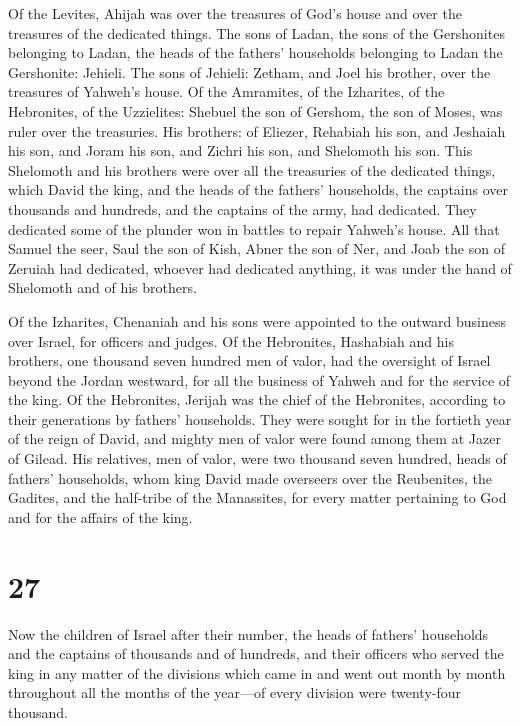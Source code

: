  Of the Levites, Ahijah was over the treasures of God's
house and over the treasures of the dedicated things.  The
sons of Ladan, the sons of the Gershonites belonging to Ladan, the heads
of the fathers' households belonging to Ladan the Gershonite: Jehieli.
 The sons of Jehieli: Zetham, and Joel his brother, over
the treasures of Yahweh's house.  Of the Amramites, of the
Izharites, of the Hebronites, of the Uzzielites:  Shebuel
the son of Gershom, the son of Moses, was ruler over the treasuries.
 His brothers: of Eliezer, Rehabiah his son, and Jeshaiah
his son, and Joram his son, and Zichri his son, and Shelomoth his son.
 This Shelomoth and his brothers were over all the
treasuries of the dedicated things, which David the king, and the heads
of the fathers' households, the captains over thousands and hundreds,
and the captains of the army, had dedicated.  They
dedicated some of the plunder won in battles to repair Yahweh's house.
 All that Samuel the seer, Saul the son of Kish, Abner the
son of Ner, and Joab the son of Zeruiah had dedicated, whoever had
dedicated anything, it was under the hand of Shelomoth and of his
brothers.

 Of the Izharites, Chenaniah and his sons were appointed to
the outward business over Israel, for officers and judges. 
Of the Hebronites, Hashabiah and his brothers, one thousand seven
hundred men of valor, had the oversight of Israel beyond the Jordan
westward, for all the business of Yahweh and for the service of the
king.  Of the Hebronites, Jerijah was the chief of the
Hebronites, according to their generations by fathers' households. They
were sought for in the fortieth year of the reign of David, and mighty
men of valor were found among them at Jazer of Gilead.  His
relatives, men of valor, were two thousand seven hundred, heads of
fathers' households, whom king David made overseers over the Reubenites,
the Gadites, and the half-tribe of the Manassites, for every matter
pertaining to God and for the affairs of the king.

\hypertarget{section-26}{%
\section{27}\label{section-26}}

 Now the children of Israel after their number, the heads of
fathers' households and the captains of thousands and of hundreds, and
their officers who served the king in any matter of the divisions which
came in and went out month by month throughout all the months of the
year---of every division were twenty-four thousand.

